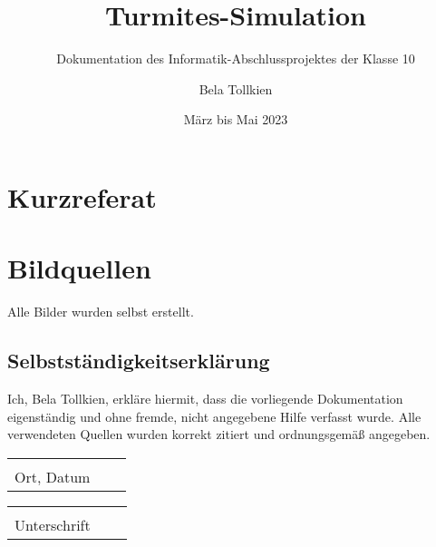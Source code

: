 \documentclass[
	fontsize=12pt,
	paper=a4,
	pagesize=auto,
	parskip=half,
    titlepage=true,
	ngerman
]{scrartcl}
\begin{document}
\title{
	Turmites-Simulation
}
\subtitle{
	Dokumentation des Informatik-Abschlussprojektes der Klasse 10
}
\author{
	Bela Tollkien
}
\date{März bis Mai 2023}

\maketitle

\tableofcontents

\filbreak
\section*{Kurzreferat}


\pagebreak



\pagebreak

\section*{Bildquellen}
Alle Bilder wurden selbst erstellt.




\filbreak
\begin{samepage}
	\section*{Selbstständigkeitserklärung}
	Ich, Bela Tollkien, erkläre hiermit, dass die vorliegende Dokumentation eigenständig und ohne fremde, nicht angegebene Hilfe verfasst wurde. Alle verwendeten Quellen wurden korrekt zitiert und ordnungsgemäß angegeben.

	\vspace{2cm}

	\noindent

	\begin{tabular}{p{5cm}p{.5cm}l}
		\dotfill \\ 
		Ort, Datum
	\end{tabular}
	\hfill
	\begin{tabular}{p{5cm}p{.5cm}l}
		\dotfill \\ 
		Unterschrift
	\end{tabular}
\end{samepage}
\end{document}
